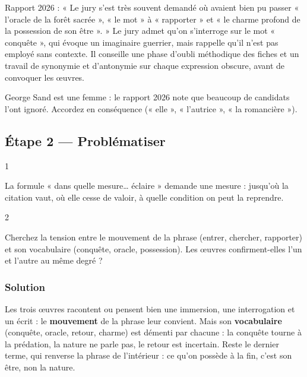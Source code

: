 \documentclass[11pt,a4paper]{article}
\begin{document}
\begin{jury}

Rapport 2026 : « Le jury s'est très souvent demandé où avaient bien pu passer « l'oracle de la forêt sacrée », « le mot » à « rapporter » et « le charme profond de la possession de son être ». » Le jury admet qu'on s'interroge sur le mot « conquête », qui évoque un imaginaire guerrier, mais rappelle qu'il n'est pas employé sans contexte. Il conseille une phase d'oubli méthodique des fiches et un travail de synonymie et d'antonymie sur chaque expression obscure, avant de convoquer les œuvres.

\end{jury}

\begin{piege}

George Sand est une femme : le rapport 2026 note que beaucoup de candidats l'ont ignoré. Accordez en conséquence (« elle », « l'autrice », « la romancière »).

\end{piege}

\hypertarget{uxe9tape-2-probluxe9matiser}{%
\subsection{Étape 2 --- Problématiser}\label{uxe9tape-2-probluxe9matiser}}

\begin{indication}{1}

La formule « dans quelle mesure\ldots{} éclaire » demande une mesure : jusqu'où la citation vaut, où elle cesse de valoir, à quelle condition on peut la reprendre.

\end{indication}

\begin{indication}{2}

Cherchez la tension entre le mouvement de la phrase (entrer, chercher, rapporter) et son vocabulaire (conquête, oracle, possession). Les œuvres confirment-elles l'un et l'autre au même degré ?

\end{indication}

\hypertarget{solution-1}{%
\subsubsection{Solution}\label{solution-1}}

Les trois œuvres racontent ou pensent bien une immersion, une interrogation et un écrit : le \textbf{mouvement} de la phrase leur convient. Mais son \textbf{vocabulaire} (conquête, oracle, retour, charme) est démenti par chacune : la conquête tourne à la prédation, la nature ne parle pas, le retour est incertain. Reste le dernier terme, qui renverse la phrase de l'intérieur : ce qu'on possède à la fin, c'est son être, non la nature.
\end{document}
